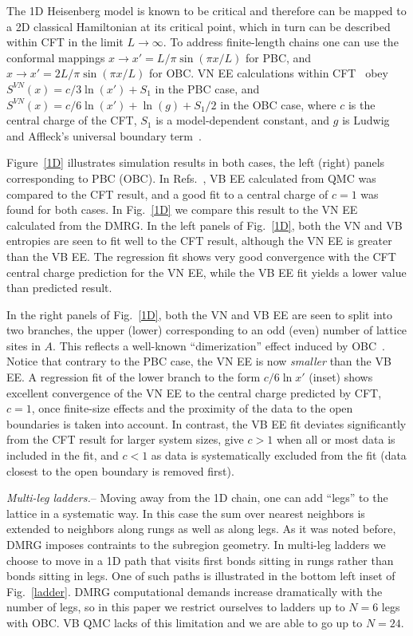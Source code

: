 \documentclass[prl,aps,twocolumn,floatfix,amsmath,amssymb,superscriptaddress,tightenlines]{revtex4}
\begin{document}
The 1D Heisenberg model is known to be critical and therefore can be
mapped to a 2D classical Hamiltonian at its critical point, which in turn
can be described within CFT in the limit $L\to\infty$.  To address
finite-length chains one can use the conformal mappings $x\to x'=L/\pi
\sin(\pi x / L)$ for PBC, and $x\to x'=2L/\pi \sin(\pi x / L)$ for OBC. VN
EE calculations within CFT~\cite{Cardy, Scholl06} obey $S^{VN}(x)= c/3
\ln(x') + S_1$ in the PBC case, and $S^{VN}(x)= c/6 \ln(x') +
\ln(g)+S_1/2$ in the OBC case, where $c$ is the central charge of the CFT,
$S_1$ is a model-dependent constant, and $g$ is Ludwig and Affleck's
universal boundary term~\cite{AffleckAndLudwig}.

Figure~\ref{1D} illustrates simulation results in both cases, the left
(right) panels corresponding to PBC (OBC). In Refs.~\cite{Alet, Chh}, VB
EE calculated from QMC was compared to the CFT result, and a good fit to a
central charge of $c=1$ was found for both cases.  In Fig.~\ref{1D} we
compare this result to the VN EE calculated from the DMRG.  In the left
panels of Fig.~\ref{1D}, both the VN and VB entropies are seen to fit well
to the CFT result, although the VN EE is greater than the VB EE. The
regression fit shows very good convergence with the CFT central charge
prediction for the VN EE, while the VB EE fit yields a lower value than
predicted result.  

In the right panels of Fig.~\ref{1D}, both the VN and VB EE are seen to
split into two branches, the upper (lower) corresponding to an odd (even)
number of lattice sites in $A$.  This reflects a well-known
``dimerization'' effect induced by OBC~\cite{Ian1}.  Notice that contrary
to the PBC case, the VN EE is now \textit{smaller} than the VB EE. A
regression fit of the lower branch to the form $c/6 \ln {x'}$ (inset)
shows excellent convergence of the VN EE to the central charge predicted
by CFT, $c=1$, once finite-size effects and the proximity of the data to
the open boundaries is taken into account.  In contrast, the VB EE fit
deviates significantly from the CFT result for larger system sizes, give
$c>1$ when all or most data is included in the fit, and $c<1$ as data is
systematically excluded from the fit (data closest to the open boundary is
removed first).

{\it Multi-leg ladders.}-- Moving away from the 1D chain, one can add
``legs'' to the lattice in a systematic way. In this case the sum over
nearest neighbors is extended to neighbors along rungs as well as along
legs.  As it was noted before, DMRG imposes contraints to the subregion
geometry. In multi-leg ladders we choose to move in a 1D path that visits
first bonds sitting in rungs rather than bonds sitting in legs. One of
such paths is illustrated in the bottom left inset of Fig.~\ref{ladder}.
DMRG computational demands increase dramatically with the number of
legs, so in this paper we restrict ourselves to ladders up to $N=6$ legs
with OBC. VB QMC lacks of this limitation and we are able to go up to
$N=24$. 
\end{document}

